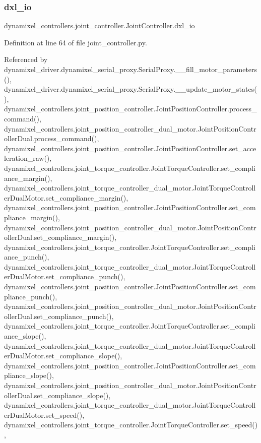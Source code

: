 \subsubsection{\texorpdfstring{dxl\+\_\+io}{dxl\_io}}
{\footnotesize\ttfamily dynamixel\+\_\+controllers.\+joint\+\_\+controller.\+Joint\+Controller.\+dxl\+\_\+io\hspace{0.3cm}{\ttfamily [inherited]}}



Definition at line 64 of file joint\+\_\+controller.\+py.



Referenced by dynamixel\+\_\+driver.\+dynamixel\+\_\+serial\+\_\+proxy.\+Serial\+Proxy.\+\_\+\+\_\+fill\+\_\+motor\+\_\+parameters(), dynamixel\+\_\+driver.\+dynamixel\+\_\+serial\+\_\+proxy.\+Serial\+Proxy.\+\_\+\+\_\+update\+\_\+motor\+\_\+states(), dynamixel\+\_\+controllers.\+joint\+\_\+position\+\_\+controller.\+Joint\+Position\+Controller.\+process\+\_\+command(), dynamixel\+\_\+controllers.\+joint\+\_\+position\+\_\+controller\+\_\+dual\+\_\+motor.\+Joint\+Position\+Controller\+Dual.\+process\+\_\+command(), dynamixel\+\_\+controllers.\+joint\+\_\+position\+\_\+controller.\+Joint\+Position\+Controller.\+set\+\_\+acceleration\+\_\+raw(), dynamixel\+\_\+controllers.\+joint\+\_\+torque\+\_\+controller.\+Joint\+Torque\+Controller.\+set\+\_\+compliance\+\_\+margin(), dynamixel\+\_\+controllers.\+joint\+\_\+torque\+\_\+controller\+\_\+dual\+\_\+motor.\+Joint\+Torque\+Controller\+Dual\+Motor.\+set\+\_\+compliance\+\_\+margin(), dynamixel\+\_\+controllers.\+joint\+\_\+position\+\_\+controller.\+Joint\+Position\+Controller.\+set\+\_\+compliance\+\_\+margin(), dynamixel\+\_\+controllers.\+joint\+\_\+position\+\_\+controller\+\_\+dual\+\_\+motor.\+Joint\+Position\+Controller\+Dual.\+set\+\_\+compliance\+\_\+margin(), dynamixel\+\_\+controllers.\+joint\+\_\+torque\+\_\+controller.\+Joint\+Torque\+Controller.\+set\+\_\+compliance\+\_\+punch(), dynamixel\+\_\+controllers.\+joint\+\_\+torque\+\_\+controller\+\_\+dual\+\_\+motor.\+Joint\+Torque\+Controller\+Dual\+Motor.\+set\+\_\+compliance\+\_\+punch(), dynamixel\+\_\+controllers.\+joint\+\_\+position\+\_\+controller.\+Joint\+Position\+Controller.\+set\+\_\+compliance\+\_\+punch(), dynamixel\+\_\+controllers.\+joint\+\_\+position\+\_\+controller\+\_\+dual\+\_\+motor.\+Joint\+Position\+Controller\+Dual.\+set\+\_\+compliance\+\_\+punch(), dynamixel\+\_\+controllers.\+joint\+\_\+torque\+\_\+controller.\+Joint\+Torque\+Controller.\+set\+\_\+compliance\+\_\+slope(), dynamixel\+\_\+controllers.\+joint\+\_\+torque\+\_\+controller\+\_\+dual\+\_\+motor.\+Joint\+Torque\+Controller\+Dual\+Motor.\+set\+\_\+compliance\+\_\+slope(), dynamixel\+\_\+controllers.\+joint\+\_\+position\+\_\+controller.\+Joint\+Position\+Controller.\+set\+\_\+compliance\+\_\+slope(), dynamixel\+\_\+controllers.\+joint\+\_\+position\+\_\+controller\+\_\+dual\+\_\+motor.\+Joint\+Position\+Controller\+Dual.\+set\+\_\+compliance\+\_\+slope(), dynamixel\+\_\+controllers.\+joint\+\_\+torque\+\_\+controller\+\_\+dual\+\_\+motor.\+Joint\+Torque\+Controller\+Dual\+Motor.\+set\+\_\+speed(), dynamixel\+\_\+controllers.\+joint\+\_\+torque\+\_\+controller.\+Joint\+Torque\+Controller.\+set\+\_\+speed(), 